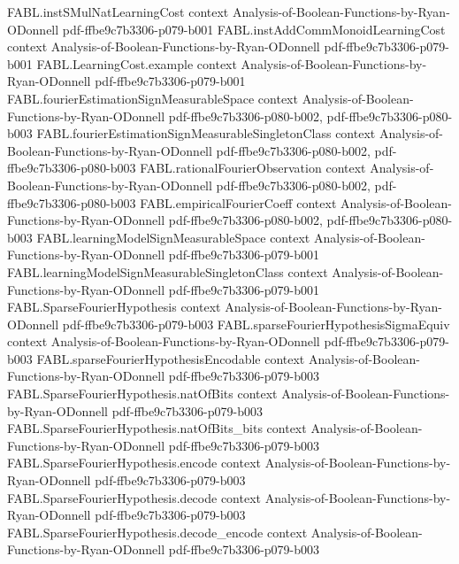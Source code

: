 \begin{theorem}
\proofstep
  {FABL.instSMulNatLearningCost}
  {context}
  {Analysis-of-Boolean-Functions-by-Ryan-ODonnell}
  {pdf-ffbe9c7b3306-p079-b001}
\proofstep
  {FABL.instAddCommMonoidLearningCost}
  {context}
  {Analysis-of-Boolean-Functions-by-Ryan-ODonnell}
  {pdf-ffbe9c7b3306-p079-b001}
\proofstep
  {FABL.LearningCost.example}
  {context}
  {Analysis-of-Boolean-Functions-by-Ryan-ODonnell}
  {pdf-ffbe9c7b3306-p079-b001}
\proofstep
  {FABL.fourierEstimationSignMeasurableSpace}
  {context}
  {Analysis-of-Boolean-Functions-by-Ryan-ODonnell}
  {pdf-ffbe9c7b3306-p080-b002,
    pdf-ffbe9c7b3306-p080-b003}
\proofstep
  {FABL.fourierEstimationSignMeasurableSingletonClass}
  {context}
  {Analysis-of-Boolean-Functions-by-Ryan-ODonnell}
  {pdf-ffbe9c7b3306-p080-b002,
    pdf-ffbe9c7b3306-p080-b003}
\proofstep
  {FABL.rationalFourierObservation}
  {context}
  {Analysis-of-Boolean-Functions-by-Ryan-ODonnell}
  {pdf-ffbe9c7b3306-p080-b002,
    pdf-ffbe9c7b3306-p080-b003}
\proofstep
  {FABL.empiricalFourierCoeff}
  {context}
  {Analysis-of-Boolean-Functions-by-Ryan-ODonnell}
  {pdf-ffbe9c7b3306-p080-b002,
    pdf-ffbe9c7b3306-p080-b003}
\proofstep
  {FABL.learningModelSignMeasurableSpace}
  {context}
  {Analysis-of-Boolean-Functions-by-Ryan-ODonnell}
  {pdf-ffbe9c7b3306-p079-b001}
\proofstep
  {FABL.learningModelSignMeasurableSingletonClass}
  {context}
  {Analysis-of-Boolean-Functions-by-Ryan-ODonnell}
  {pdf-ffbe9c7b3306-p079-b001}
\proofstep
  {FABL.SparseFourierHypothesis}
  {context}
  {Analysis-of-Boolean-Functions-by-Ryan-ODonnell}
  {pdf-ffbe9c7b3306-p079-b003}
\proofstep
  {FABL.sparseFourierHypothesisSigmaEquiv}
  {context}
  {Analysis-of-Boolean-Functions-by-Ryan-ODonnell}
  {pdf-ffbe9c7b3306-p079-b003}
\proofstep
  {FABL.sparseFourierHypothesisEncodable}
  {context}
  {Analysis-of-Boolean-Functions-by-Ryan-ODonnell}
  {pdf-ffbe9c7b3306-p079-b003}
\proofstep
  {FABL.SparseFourierHypothesis.natOfBits}
  {context}
  {Analysis-of-Boolean-Functions-by-Ryan-ODonnell}
  {pdf-ffbe9c7b3306-p079-b003}
\proofstep
  {FABL.SparseFourierHypothesis.natOfBits_bits}
  {context}
  {Analysis-of-Boolean-Functions-by-Ryan-ODonnell}
  {pdf-ffbe9c7b3306-p079-b003}
\proofstep
  {FABL.SparseFourierHypothesis.encode}
  {context}
  {Analysis-of-Boolean-Functions-by-Ryan-ODonnell}
  {pdf-ffbe9c7b3306-p079-b003}
\proofstep
  {FABL.SparseFourierHypothesis.decode}
  {context}
  {Analysis-of-Boolean-Functions-by-Ryan-ODonnell}
  {pdf-ffbe9c7b3306-p079-b003}
\proofstep
  {FABL.SparseFourierHypothesis.decode_encode}
  {context}
  {Analysis-of-Boolean-Functions-by-Ryan-ODonnell}
  {pdf-ffbe9c7b3306-p079-b003}

\end{theorem}
